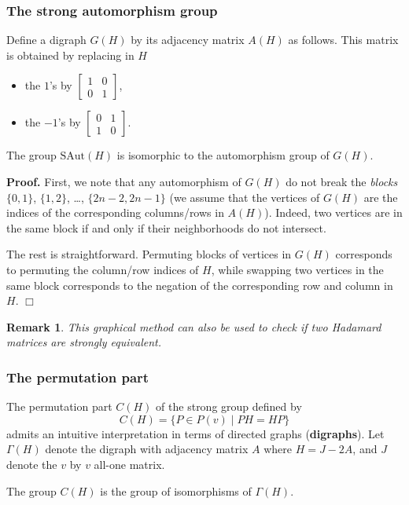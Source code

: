 \documentclass[12pt]{article}
\newenvironment{pf}{\noindent\textbf{Proof.}\quad}{\hfill{$\Box$}}
\newtheorem{rem}{Remark}
\def\SAut{\mathrm{SAut}}
\begin{document}
\subsubsection{The strong automorphism group}


Define a digraph $G(H)$ by its adjacency matrix $A(H)$ as follows.
This matrix is obtained  by replacing in $H$
\begin{itemize}
\item
the  $1$'s by
$\left[\begin{array}{cc}1&0\\0&1\end{array}\right]$,
\item
the  $-1$'s by
$\left[\begin{array}{cc}0&1\\1&0\end{array}\right]$.
\end{itemize}

{\thm The group $\SAut(H)$ is isomorphic to the automorphism group of $G(H)$. }

\begin{pf}
 First, we note that any automorphism
of $G(H)$ do not break the \emph{blocks}
$\{0,1\}$, $\{1,2\}$, \ldots, $\{2n-2,2n-1\}$
(we assume that the vertices of $G(H)$
are the indices of the corresponding columns/rows in $A(H)$).
Indeed, two vertices are in the same block
if and only if their neighborhoods do not intersect.

 The rest is straightforward.
Permuting blocks of vertices in $G(H)$ corresponds to
permuting the column/row indices of $H$,
while swapping two vertices in the same block
corresponds to the negation of the corresponding
row and column in $H$.
\end{pf}
\begin{rem}
{\em This graphical method can also be used to check if two Hadamard matrices are strongly equivalent.}
\end{rem}
\subsubsection{The permutation part}
The permutation part $C(H)$ of the strong group defined by $$C(H)=\{ P \in P(v) \mid PH=HP \}$$ admits an intuitive interpretation in terms of directed graphs ({\bf digraphs}).
Let $\Gamma(H)$ denote the digraph with adjacency matrix $A$ where $H=J-2A$, and $J$ denote the $v$ by $v$ all-one matrix.

{\thm The group $C(H)$ is the group of isomorphisms of  $\Gamma(H)$.}
\end{document}
